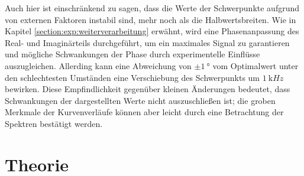 Auch hier ist einschränkend zu sagen, dass die Werte der Schwerpunkte aufgrund von externen Faktoren instabil sind, mehr noch als die Halbwertsbreiten. Wie in Kapitel \ref{section:exp:weiterverarbeitung} erwähnt, wird eine Phasenanpassung des Real- und Imaginärteils durchgeführt, um ein maximales Signal zu garantieren und mögliche Schwankungen der Phase durch experimentelle Einflüsse auszugleichen. Allerding kann eine Abweichung von $\pm \SI{1}{\degree}$ vom Optimalwert unter den schlechtesten Umständen eine Verschiebung des Schwerpunkts um $\SI{1}{\kilo Hz}$ bewirken. Diese Empfindlichkeit gegenüber kleinen Änderungen bedeutet, dass Schwankungen der dargestellten Werte nicht auszuschließen ist; die groben Merkmale der Kurvenverläufe können aber leicht durch eine Betrachtung der Spektren bestätigt werden.












\section{Theorie} \label{section:res:theorie}















